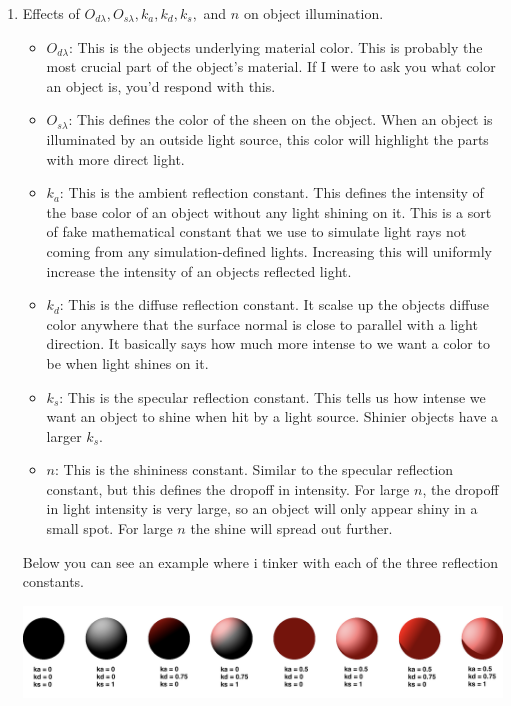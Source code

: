 \documentclass{assignment}
\date{\today}
\begin{document}
\begin{enumerate}
 \item Effects of \(O_{d \lambda}, O_{s \lambda}, k_a, k_d, k_s,\) and \(n\) on object illumination.
       \begin{itemize}
        \item \(O_{d \lambda}\): This is the objects underlying material color.  This is probably the most crucial part of the object's material.  If I were to ask you what color an object is, you'd respond with this.

        \item \(O_{s \lambda}\): This defines the color of the sheen on the object.  When an object is illuminated by an outside light source, this color will highlight the parts with more direct light.

        \item \(k_a\): This is the ambient reflection constant.  This defines the intensity of the base color of an object without any light shining on it.  This is a sort of fake mathematical constant that we use to simulate light rays not coming from any simulation-defined lights.  Increasing this will uniformly increase the intensity of an objects reflected light.

        \item \(k_d\): This is the diffuse reflection constant.  It scalse up the objects diffuse color anywhere that the surface normal is close to parallel with a light direction.  It basically says how much more intense to we want a color to be when light shines on it.

        \item \(k_s\): This is the specular reflection constant.  This tells us how intense we want an object to shine when hit by a light source.  Shinier objects have a larger \(k_s\).

        \item \(n\): This is the shininess constant.  Similar to the specular reflection constant, but this defines the dropoff in intensity.  For large \(n\), the dropoff in light intensity is very large, so an object will only appear shiny in a small spot.  For large \(n\) the shine will spread out further.
       \end{itemize}

       Below you can see an example where i tinker with each of the three reflection constants.

       \includegraphics[width=15.5cm]{img/mtlcolor.png}


\end{enumerate}
\end{document}
